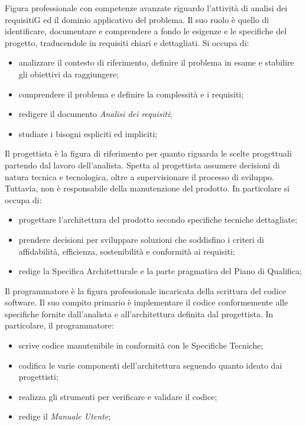 Figura professionale con competenze avanzate riguardo l’attività di analisi dei requisitiG ed il dominio applicativo del problema. Il suo ruolo è quello di identificare, documentare e comprendere a fondo le esigenze e le specifiche del progetto, traducendole in requisiti chiari e dettagliati. Si occupa di:
\begin{itemize}
    \item analizzare il contesto di riferimento, definire il problema in esame e stabilire gli obiettivi da raggiungere;
    \item comprendere il  problema e definire la complessità e i requisiti;
    \item redigere il documento \textit{Analisi dei requisiti};
    \item studiare i bisogni espliciti ed impliciti;
\end{itemize}
Il progettista è la figura di riferimento per quanto riguarda le scelte progettuali partendo dal lavoro dell’analista. Spetta al progettista assumere decisioni di natura tecnica e tecnologica, oltre a supervisionare il processo di sviluppo. Tuttavia, non è responsabile della manutenzione del prodotto.
In particolare si occupa di:
\begin{itemize}
    \item progettare l’architettura del prodotto secondo specifiche tecniche dettagliate;
    \item prendere decisioni per sviluppare soluzioni che soddisfino i criteri di affidabilità,
    efficienza, sostenibilità e conformità ai requisiti;
    \item redige la Specifica Architetturale e la parte pragmatica del Piano di Qualifica;
\end{itemize}
Il programmatore è la figura professionale incaricata della scrittura del codice software. Il suo compito primario è implementare il codice conformemente alle specifiche fornite dall’analista e all’architettura definita dal progettista.
In particolare, il programmatore:
\begin{itemize}
    \item scrive codice manutenibile in conformità con le Specifiche Tecniche;
    \item codifica le varie componenti dell’architettura seguendo quanto ideato dai progettisti;
    \item realizza gli strumenti per verificare e validare il codice;
    \item redige il \textit{Manuale Utente};
\end{itemize}
